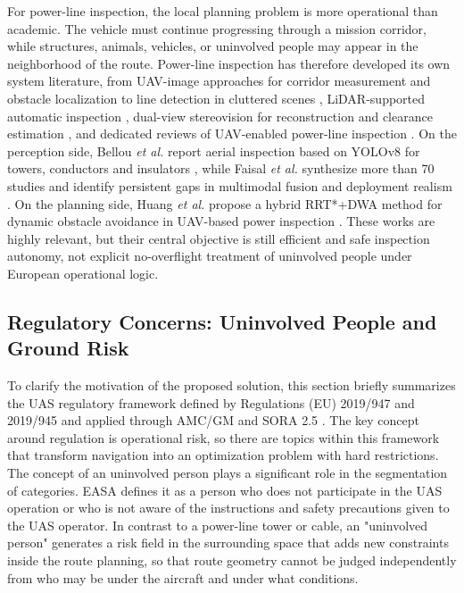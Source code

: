 \documentclass[drones,article,submit,moreauthors]{Definitions/mdpi}
\begin{document}
For power-line inspection, the local planning problem is more operational than academic. The vehicle must continue progressing through a mission corridor, while structures, animals, vehicles, or uninvolved people may appear in the neighborhood of the route. Power-line inspection has therefore developed its own system literature, from UAV-image approaches for corridor measurement and obstacle localization \cite{zhang2017powerline} to line detection in cluttered scenes \cite{zhang2019powerlines}, LiDAR-supported automatic inspection \cite{guan2021uavlidar}, dual-view stereovision for reconstruction and clearance estimation \cite{zhou2022dualview}, and dedicated reviews of UAV-enabled power-line inspection \cite{mendu2025state}. On the perception side, Bellou \emph{et al.} report aerial inspection based on YOLOv8 for towers, conductors and insulators \cite{bellou2024aerial}, while Faisal \emph{et al.} synthesize more than 70 studies and identify persistent gaps in multimodal fusion and deployment realism \cite{faisal2025deep}. On the planning side, Huang \emph{et al.} propose a hybrid RRT*+DWA method for dynamic obstacle avoidance in UAV-based power inspection \cite{huang2025hybrid}. These works are highly relevant, but their central objective is still efficient and safe inspection autonomy, not explicit no-overflight treatment of uninvolved people under European operational logic.

\subsection{Regulatory Concerns: Uninvolved People and Ground Risk}

To clarify the motivation of the proposed solution, this section briefly summarizes the UAS regulatory framework defined by Regulations (EU) 2019/947 and 2019/945 and applied through AMC/GM and SORA 2.5 \cite{EU2019_947,EU2019_945,JARUS_SORA_2_5_2024,EASA_AMC_GM_SORA25_2025}. The key concept around regulation is operational risk, so there are topics within this framework that transform navigation into an optimization problem with hard restrictions. The concept of an uninvolved person plays a significant role in the segmentation of categories. EASA defines it as a person who does not participate in the UAS operation or who is not aware of the instructions and safety precautions given to the UAS operator. In contrast to a power-line tower or cable, an "uninvolved person" generates a risk field in the surrounding space that adds new constraints inside the route planning, so that route geometry cannot be judged independently from who may be under the aircraft and under what conditions. 
\end{document}
